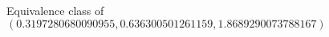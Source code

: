 \documentclass[preview]{standalone}
\begin{document}
\begin{center}
Equivalence class of $(0.3197280680090955, 0.636300501261159, 1.8689290073788167)$
\end{center}
\end{document}
